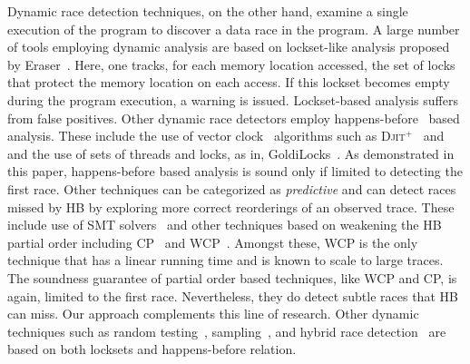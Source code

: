 Dynamic race detection techniques, on the other hand,
examine a single execution of the
program to discover a data race in the program.
A large number of tools employing dynamic analysis are 
based on lockset-like analysis proposed by Eraser~\cite{savage1997eraser}.
Here, one tracks, for each memory location accessed, the set of
locks that protect the memory location on each access.
If this lockset becomes empty during the program execution,
a warning is issued.
Lockset-based analysis suffers from false positives.
Other dynamic race detectors  employ happens-before~\cite{lamport1978time} based
analysis. 
These include the use of 
vector clock~\cite{Mattern1988,Fidge:1991:LTD:112827.112860} 
algorithms such as \textsc{Djit}$^+$~\cite{Pozniansky:2003:EOD:966049.781529} and \fasttrack~\cite{fasttrack}
and the use of sets of threads and locks, as in, GoldiLocks~\cite{elmas2007goldilocks}.
As demonstrated in this paper, happens-before based analysis is 
sound only if limited to detecting the first race.
Other techniques can be categorized as \emph{predictive}
and can detect races missed by HB by exploring more correct reorderings of an observed trace.
These include use of SMT solvers~\cite{Said2011,rv2014,ipa2016,Huang2016}
and other techniques based on weakening the HB partial order
including CP~\cite{cp2012} and WCP~\cite{wcp2017}.
Amongst these, WCP is the only technique that has a linear running
time and is known to scale to large traces.
The soundness guarantee of partial order based techniques, like WCP and CP,
is again, limited to the first race.
Nevertheless, they do detect subtle races that HB can miss.
Our approach complements this line of research.
Other dynamic techniques such as random 
testing~\cite{Sen:2008:RDR:1375581.1375584},
sampling~\cite{marino2009literace,Erickson:2010:EDD:1924943.1924954},
and hybrid race detection~\cite{choi:2003:HDD:781498.781528}
are based on both locksets and happens-before relation.
